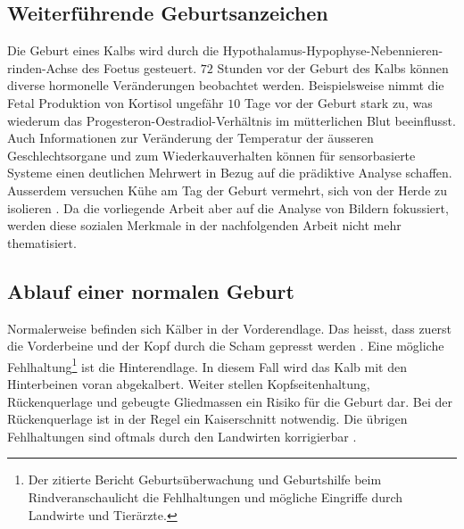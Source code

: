 \subsection{Weiterführende Geburtsanzeichen}
Die Geburt eines Kalbs wird durch die \gls{Hypothalamus}-\gls{Hypophyse}-Nebennieren-rinden-Achse des \gls{Foetus} gesteuert. $72$ Stunden vor der Geburt des Kalbs können diverse hormonelle Veränderungen beobachtet werden. Beispielsweise nimmt die \gls{Fetal} Produktion von \gls{Kortisol} ungefähr $10$ Tage vor der Geburt stark zu, was wiederum das \gls{Progesteron}-\gls{Oestradiol}-Verhältnis im mütterlichen Blut beeinflusst. Auch Informationen zur Veränderung der Temperatur der äusseren Geschlechtsorgane und zum Wiederkauverhalten können für sensorbasierte Systeme einen deutlichen Mehrwert in Bezug auf die prädiktive Analyse schaffen. Ausserdem versuchen Kühe am Tag der Geburt vermehrt, sich von der Herde zu isolieren \citep[S.1-4]{Saint-Dizier2015}. 
Da die vorliegende Arbeit aber auf die Analyse von Bildern fokussiert, werden diese sozialen Merkmale in der nachfolgenden Arbeit nicht mehr thematisiert. 
\subsection{Ablauf einer normalen Geburt}
Normalerweise befinden sich Kälber in der Vorderendlage. Das heisst, dass zuerst die Vorderbeine und der Kopf durch die Scham gepresst werden \citep{Muller2020}. Eine mögliche Fehlhaltung\footnote{Der zitierte Bericht \flqq Geburtsüberwachung und Geburtshilfe beim Rind\frqq veranschaulicht die Fehlhaltungen und mögliche Eingriffe durch Landwirte und Tierärzte.} ist die Hinterendlage. In diesem Fall wird das Kalb mit den Hinterbeinen voran abgekalbert. Weiter stellen Kopfseitenhaltung, Rückenquerlage und gebeugte Gliedmassen ein Risiko für die Geburt dar. Bei der Rückenquerlage ist in der Regel ein Kaiserschnitt notwendig. Die übrigen Fehlhaltungen sind oftmals durch den Landwirten korrigierbar \citep[S. 17, 24-26]{Traulsen2013}.

